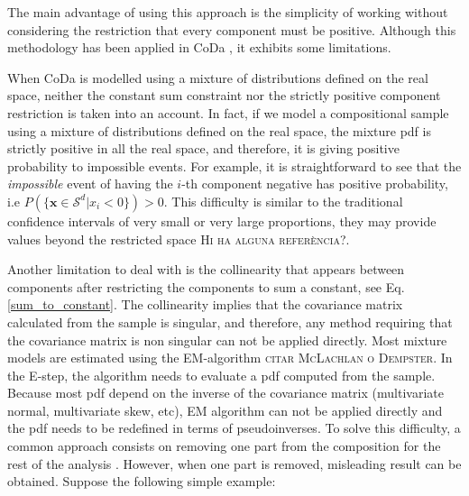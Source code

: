 \documentclass[10pt, a4paper]{article}
\begin{document}
The main advantage of using this approach is the simplicity of working without considering the restriction that every component must be positive.
Although this methodology has been applied in CoDa \citep[see][]{papageorgiou2001model}, it exhibits some limitations.


When CoDa is modelled using a mixture of distributions defined on the real space, neither the constant sum constraint nor the strictly positive component restriction is taken into an account. In fact, if we model a compositional sample using a mixture of distributions defined on the real space, the mixture pdf is strictly positive in all the real space, and therefore, it is giving positive probability to impossible events. For example, it is straightforward to see that the \emph{impossible} event  of having the $i$-th component negative has positive probability, i.e $P(\{ \textbf{x} \in \mathcal{S}^d | x_i < 0 \}) > 0$. This difficulty is similar to the traditional confidence intervals of very small or very large proportions, they may provide values beyond the restricted space \textsc{\color{red}Hi ha alguna referència?}.


Another limitation to deal with is the collinearity that appears between components  after restricting the components to sum a constant, see Eq. \ref{sum_to_constant}. The collinearity implies that the covariance matrix calculated from the sample is singular, and therefore, any method requiring that the covariance matrix is non singular can not be applied directly. Most mixture models are estimated using the EM-algorithm \textsc{\color{red}citar McLachlan o Dempster}. In the E-step, the algorithm needs to evaluate a pdf computed from the sample. Because most pdf depend on the inverse of the covariance matrix (multivariate normal, multivariate skew, etc), EM algorithm can not be applied directly and the pdf needs to be redefined in terms of pseudoinverses. To solve this difficulty, a common approach consists on removing one part from the composition for the rest of the analysis \citep{papageorgiou2001model}. However, when one part is removed,  misleading result can be obtained. Suppose the following simple example: 
\end{document}
